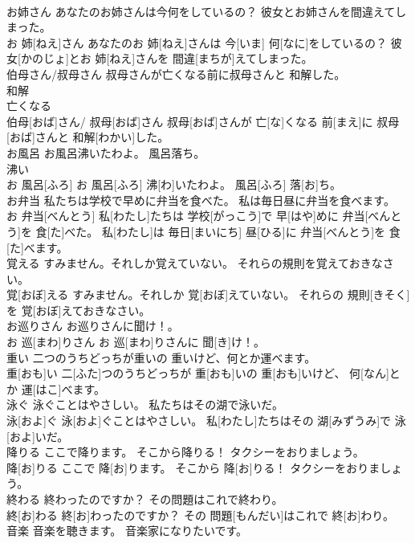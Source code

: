 \documentclass[8pt]{extreport}
\begin{document}
\begin{CJK}{UTF8}{min}
\\	お姉さん あなたのお姉さんは今何をしているの？ 彼女とお姉さんを間違えてしまった。	
\\	お 姉[ねえ]さん あなたのお 姉[ねえ]さんは 今[いま] 何[なに]をしているの？ 彼女[かのじょ]とお 姉[ねえ]さんを 間違[まちが]えてしまった。
\\	伯母さん/叔母さん 叔母さんが亡くなる前に叔母さんと 和解した。	
\\	和解 
\\	亡くなる 
\\	伯母[おば]さん/ 叔母[おば]さん 叔母[おば]さんが 亡[な]くなる 前[まえ]に 叔母[おば]さんと 和解[わかい]した。
\\	お風呂 お風呂沸いたわよ。 風呂落ち。	
\\	沸い 
\\	お 風呂[ふろ] お 風呂[ふろ] 沸[わ]いたわよ。 風呂[ふろ] 落[お]ち。
\\	お弁当 私たちは学校で早めに弁当を食べた。 私は毎日昼に弁当を食べます。	
\\	お 弁当[べんとう] 私[わたし]たちは 学校[がっこう]で 早[はや]めに 弁当[べんとう]を 食[た]べた。 私[わたし]は 毎日[まいにち] 昼[ひる]に 弁当[べんとう]を 食[た]べます。
\\	覚える すみません。それしか覚えていない。 それらの規則を覚えておきなさい。	
\\	覚[おぼ]える すみません。それしか 覚[おぼ]えていない。 それらの 規則[きそく]を 覚[おぼ]えておきなさい。
\\	お巡りさん お巡りさんに聞け！。	
\\	お 巡[まわ]りさん お 巡[まわ]りさんに 聞[き]け！。
\\	重い 二つのうちどっちが重いの 重いけど、何とか運べます。	
\\	重[おも]い 二[ふた]つのうちどっちが 重[おも]いの 重[おも]いけど、 何[なん]とか 運[はこ]べます。
\\	泳ぐ 泳ぐことはやさしい。 私たちはその湖で泳いだ。	
\\	泳[およ]ぐ 泳[およ]ぐことはやさしい。 私[わたし]たちはその 湖[みずうみ]で 泳[およ]いだ。
\\	降りる ここで降ります。 そこから降りる！ タクシーをおりましょう。	
\\	降[お]りる ここで 降[お]ります。 そこから 降[お]りる！ タクシーをおりましょう。
\\	終わる 終わったのですか？ その問題はこれで終わり。	
\\	終[お]わる 終[お]わったのですか？ その 問題[もんだい]はこれで 終[お]わり。
\\	音楽 音楽を聴きます。 音楽家になりたいです。	

\end{CJK}
\end{document}
